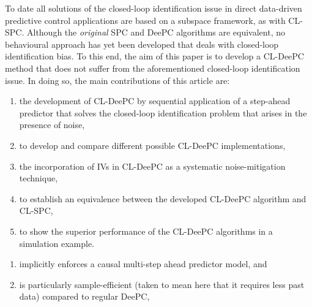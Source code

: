 %
To date all solutions of the closed-loop identification issue in direct data-driven predictive control applications are based on a subspace framework, as with \ac{CL-SPC}. Although the \textit{original} \ac{SPC} and \ac{DeePC} algorithms are equivalent, no behavioural approach has yet been developed that deals with closed-loop identification bias.  To this end, the aim of this paper is to develop a \ac{CL-DeePC} method that does not suffer from the aforementioned closed-loop identification issue. In doing so, the main contributions of this article are: %
\begin{enumerate}%
\item the development of \ac{CL-DeePC} by sequential application of a step-ahead predictor that solves the closed-loop identification problem that arises in the presence of noise, \label{contribution:solves_CL_issue}
\item to develop and compare different possible \ac{CL-DeePC} implementations,
\item the incorporation of \ac{IVs} in \ac{CL-DeePC} as a systematic noise-mitigation technique,
\item to establish an equivalence between the developed \ac{CL-DeePC} algorithm and \ac{CL-SPC},
\item to show the superior performance of the \ac{CL-DeePC} algorithms in a simulation example.
\end{enumerate}

\begin{enumerate}
    \item implicitly enforces a causal multi-step ahead predictor model, and \label{contribution:causality}
    \item is particularly sample-efficient (taken to mean here that it requires less past data) compared to regular \ac{DeePC}, \label{contribution:sample_efficient}
\end{enumerate}